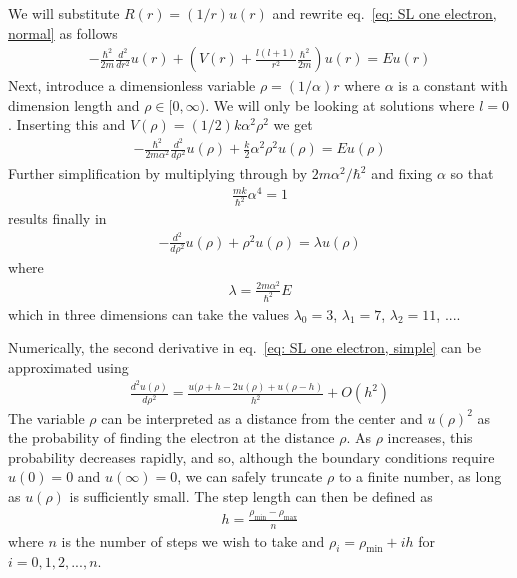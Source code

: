 \documentclass[11pt, a4paper]{article}
\begin{document}
			We will substitute $R(r) = (1/r)u(r)$ and rewrite eq.~\eqref{eq: SL one electron, normal} as follows
			\begin{align*}
				-\frac{\hbar^2}{2m} \frac{d^2}{dr^2}u(r) + \left( V(r) + \frac{l(l+1)}{r^2}\frac{\hbar^2}{2m} \right) u(r) = Eu(r)
			\end{align*}
			Next, introduce a dimensionless variable $\rho = (1/\alpha)r$ where $\alpha$ is a constant with dimension length and $\rho \in [0, \infty)$. We will only be looking at solutions where $l=0$. Inserting this and $V(\rho)=(1/2)k\alpha^2\rho^2$ we get 
			\begin{align}
				-\frac{\hbar^2}{2m\alpha^2}\frac{d^2}{d\rho^2}u(\rho) + \frac{k}{2}\alpha^2\rho^2u(\rho) = Eu(\rho) \label{eq: SL one electron halfway there}
			\end{align}
			Further simplification by multiplying through by $2m\alpha^2/\hbar^2$ and fixing $\alpha$ so that
			\begin{align*}
				\frac{mk}{\hbar^2}\alpha^4 = 1
			\end{align*}
			results finally in
			\begin{align}
				-\frac{d^2}{d\rho^2}u(\rho) + \rho^2u(\rho) = \lambda u(\rho) \label{eq: SL one electron, simple}
			\end{align}
			where 
			\begin{align*}
				\lambda = \frac{2m\alpha^2}{\hbar^2}E
			\end{align*}
			which in three dimensions can take the values $\lambda_0 = 3$, $\lambda_1 = 7$, $\lambda_2 = 11$, ....
			
			Numerically, the second derivative in eq.~\eqref{eq: SL one electron, simple} can be approximated using
			\begin{align}
				\frac{d^2u(\rho)}{d\rho^2} = \frac{u(\rho + h - 2u(\rho) + u(\rho - h)}{h^2} + O(h^2) \label{eq: def. second derivative}
			\end{align}
			The variable $\rho$ can be interpreted as a distance from the center and $u(\rho)^2$ as the probability of finding the electron at the distance $\rho$. As $\rho$ increases, this probability decreases rapidly, and so, although the boundary conditions require $u(0)=0$ and $u(\infty)=0$, we can safely truncate $\rho$ to a finite number, as long as $u(\rho)$ is sufficiently small. The step length can then be defined as
			\begin{align*}
				h = \frac{\rho_\mathrm{min} - \rho_\mathrm{max}}{n}
			\end{align*}
			where $n$ is the number of steps we wish to take and $\rho_i = \rho_\mathrm{min} + ih$ for $i=0, 1, 2, ..., n$.
			
\end{document}
